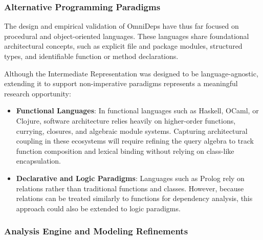 \subsubsection{Alternative Programming Paradigms}
\label{subsec:future_paradigms}

The design and empirical validation of OmniDeps have thus far focused on
procedural and object-oriented languages. These languages share
foundational architectural concepts, such as explicit file and
package modules, structured types, and identifiable function or
method declarations.

Although the Intermediate Representation was designed to be language-agnostic,
extending it to support non-imperative paradigms represents a meaningful
research opportunity:
\begin{itemize}
  \item \textbf{Functional Languages}: In functional languages such as Haskell,
    OCaml, or Clojure, software architecture relies heavily on higher-order
    functions, currying, closures, and algebraic module systems. Capturing
    architectural coupling in these ecosystems will require refining the query
    algebra to track function composition and lexical binding without relying
    on class-like encapsulation.
  \item \textbf{Declarative and Logic Paradigms}: Languages such as
    Prolog rely on relations
    rather than traditional functions and classes. However, because relations
    can be treated similarly to functions for dependency analysis, this
    approach could also be extended to logic paradigms.
\end{itemize}

\subsubsection{Analysis Engine and Modeling Refinements}
\label{subsec:future_engine_refinements}

